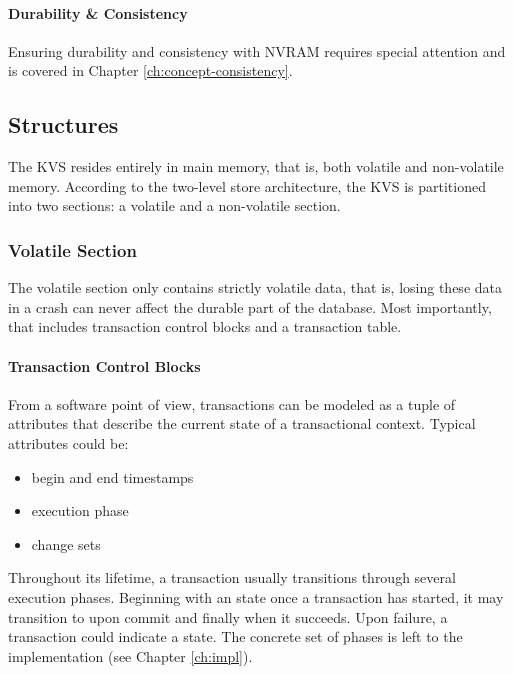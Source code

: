 \paragraph{Durability \& Consistency}

Ensuring durability and consistency with \ac{NVRAM} requires special attention
and is covered in Chapter \ref{ch:concept-consistency}.

\subsection{Structures}

The \ac{KVS} resides entirely in main memory, that is, both volatile and
non-volatile memory. According to the two-level store architecture, the \ac{KVS}
is partitioned into two sections: a volatile and a non-volatile section.

\subsubsection{Volatile Section}

The volatile section only contains strictly volatile data, that is, losing these
data in a crash can never affect the durable part of the database. Most
importantly, that includes transaction control blocks and a transaction table.

\paragraph{Transaction Control Blocks}

From a software point of view, transactions can be modeled as a tuple of
attributes that describe the current state of a transactional context. Typical
attributes could be:

\begin{itemize}
    \item begin and end timestamps
    \item execution phase
    \item change sets
\end{itemize}

Throughout its lifetime, a transaction usually transitions through several
execution phases. Beginning with an  state once a transaction has
started, it may transition to  upon commit and finally
 when it succeeds. Upon failure, a transaction could indicate a
 state. The concrete set of phases is left to the implementation (see Chapter \ref{ch:impl}).

